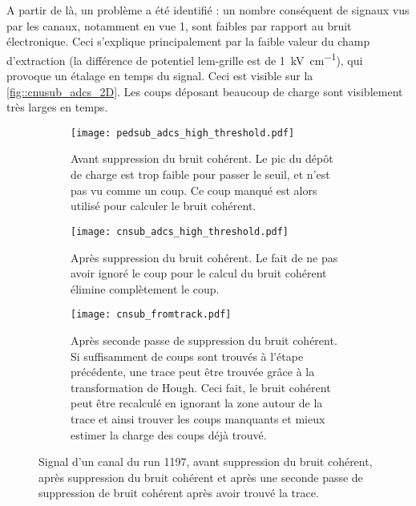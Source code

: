       A partir de là, un problème a été identifié : un nombre conséquent de signaux vus par les canaux, notamment en vue 1, sont faibles par rapport au bruit électronique. Ceci s'explique principalement par la faible valeur du champ d'extraction (la différence de potentiel \gls{lem}-grille est de \SI{1}{\kilo\volt\per\centi\meter}), qui provoque un étalage en temps du signal. Ceci est visible sur la \autoref{fig::cnusub_adcs_2D}. Les coups déposant beaucoup de charge sont visiblement très larges en temps.

      \begin{figure}[htbp]
        \centering
        \begin{subfigure}[t]{0.9\textwidth}
          \centering
          \texttt{[image: pedsub\_adcs\_high\_threshold.pdf]}
          \caption{Avant suppression du bruit cohérent. Le pic du dépôt de charge est trop faible pour passer le seuil, et n'est pas vu comme un coup. Ce coup manqué est alors utilisé pour calculer le bruit cohérent.}
        \end{subfigure}\hfill
        \begin{subfigure}[t]{0.9\textwidth}
          \centering
          \texttt{[image: cnsub\_adcs\_high\_threshold.pdf]}
          \caption{Après suppression du bruit cohérent. Le fait de ne pas avoir ignoré le coup pour le calcul du bruit cohérent élimine complètement le coup.}
        \end{subfigure}
        \begin{subfigure}[t]{0.9\textwidth}
          \centering
          \texttt{[image: cnsub\_fromtrack.pdf]}
          \caption{Après seconde passe de suppression du bruit cohérent. Si suffisamment de coups sont trouvés à l'étape précédente, une trace peut être trouvée grâce à la transformation de Hough. Ceci fait, le bruit cohérent peut être recalculé en ignorant la zone autour de la trace et ainsi trouver les coups manquants et mieux estimer la charge des coups déjà trouvé.}
        \end{subfigure}
        \caption[Supression du bruit cohérent]{\label{fig::strip_before_after_cnsub}Signal d'un canal du run 1197, avant suppression du bruit cohérent, après suppression du bruit cohérent et après une seconde passe de suppression de bruit cohérent après avoir trouvé la trace.}
      \end{figure}

